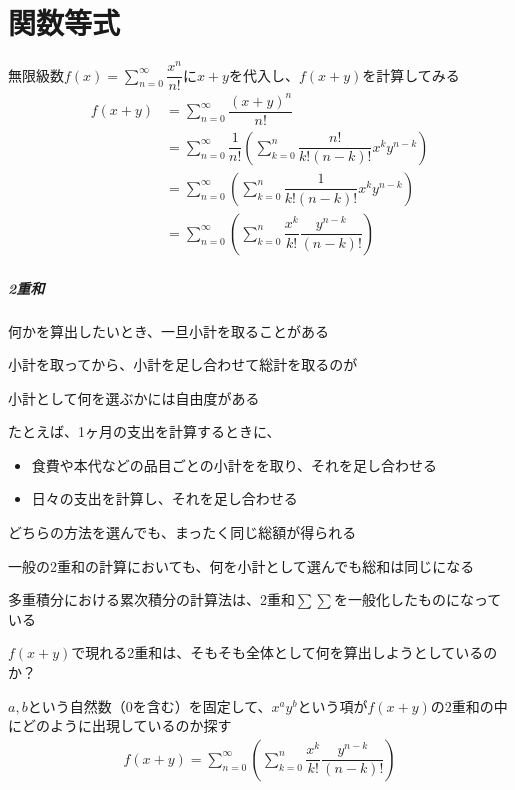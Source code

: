 \documentclass[../book_jiriki_calc]{subfiles}
\begin{document}
\section{関数等式}

無限級数$\displaystyle f(x) = \sum_{n=0}^{\infty} \dfrac{x^n}{n!}$に$x+y$を代入し、$f(x+y)$を計算してみる
\begin{align}
  f(x+y) & = \sum_{n=0}^{\infty} \dfrac{(x+y)^n}{n!}                                                          \\
         & = \sum_{n=0}^{\infty} \dfrac{1}{n!} \left( \sum_{k=0}^{n} \dfrac{n!}{k!(n-k)!} x^k y^{n-k} \right) \\
         & = \sum_{n=0}^{\infty} \left( \sum_{k=0}^{n} \dfrac{1}{k!(n-k)!} x^k y^{n-k} \right)                \\
         & = \sum_{n=0}^{\infty} \left( \sum_{k=0}^{n} \dfrac{x^k}{k!} \dfrac{y^{n-k}}{(n-k)!} \right)
\end{align}

\sectionline

\subparagraph{2重和}

何かを算出したいとき、一旦小計を取ることがある

小計を取ってから、小計を足し合わせて総計を取るのが

\br

小計として何を選ぶかには自由度がある

たとえば、1ヶ月の支出を計算するときに、
\begin{itemize}
  \item 食費や本代などの品目ごとの小計をを取り、それを足し合わせる
  \item 日々の支出を計算し、それを足し合わせる
\end{itemize}
どちらの方法を選んでも、まったく同じ総額が得られる

一般の2重和の計算においても、何を小計として選んでも総和は同じになる

\br

多重積分における累次積分の計算法は、2重和$\sum\sum$を一般化したものになっている

\sectionline

$f(x+y)$で現れる2重和は、そもそも全体として何を算出しようとしているのか？

\br

$a, b$という自然数（$0$を含む）を固定して、$x^ay^b$という項が$f(x+y)$の2重和の中にどのように出現しているのか探す
\begin{align}
  f(x+y) = \sum_{n=0}^{\infty} \left( \sum_{k=0}^{n} \dfrac{x^k}{k!} \dfrac{y^{n-k}}{(n-k)!} \right)
\end{align}
\end{document}
